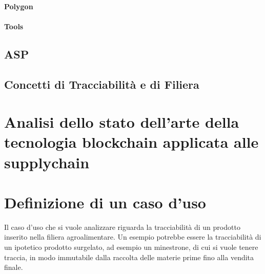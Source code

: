 \documentclass[a4paper,11pt]{article}
\begin{document}
\paragraph{Polygon}
\paragraph{Tools}

\subsection{ASP}

\subsection{Concetti di Tracciabilità e di Filiera}

\section{Analisi dello stato dell’arte della tecnologia blockchain applicata alle supplychain}
\section{Definizione di un caso d’uso}
Il caso d'uso che si vuole analizzare riguarda la tracciabilità di un prodotto inserito nella filiera agroalimentare. Un esempio potrebbe essere la tracciabilità di un ipotetico prodotto surgelato, ad esempio un minestrone, di cui si vuole tenere traccia, in modo immutabile dalla raccolta delle materie prime fino alla vendita finale.
























\end{document}
